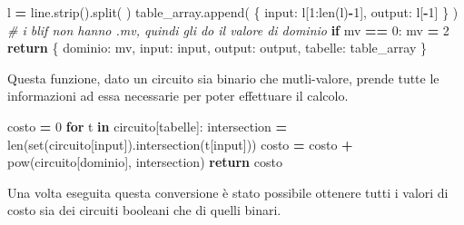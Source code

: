 \documentclass[
  italian,
]{book}
\newenvironment{Shaded}{\begin{snugshade}}{\end{snugshade}}
\newcommand{\BuiltInTok}[1]{#1}
\newcommand{\CommentTok}[1]{\textcolor[rgb]{0.56,0.35,0.01}{\textit{#1}}}
\newcommand{\ControlFlowTok}[1]{\textcolor[rgb]{0.13,0.29,0.53}{\textbf{#1}}}
\newcommand{\DecValTok}[1]{\textcolor[rgb]{0.00,0.00,0.81}{#1}}
\newcommand{\KeywordTok}[1]{\textcolor[rgb]{0.13,0.29,0.53}{\textbf{#1}}}
\newcommand{\NormalTok}[1]{#1}
\newcommand{\OperatorTok}[1]{\textcolor[rgb]{0.81,0.36,0.00}{\textbf{#1}}}
\newcommand{\StringTok}[1]{\textcolor[rgb]{0.31,0.60,0.02}{#1}}
\begin{document}
\begin{Shaded}
\begin{Highlighting}[]
\NormalTok{      l }\OperatorTok{=}\NormalTok{ line.strip().split(}\StringTok{\textquotesingle{} \textquotesingle{}}\NormalTok{)}
\NormalTok{      table\_array.append(}
\NormalTok{        \{}
          \StringTok{\textquotesingle{}input\textquotesingle{}}\NormalTok{:    l[}\DecValTok{1}\NormalTok{:}\BuiltInTok{len}\NormalTok{(l)}\OperatorTok{{-}}\DecValTok{1}\NormalTok{],}
          \StringTok{\textquotesingle{}output\textquotesingle{}}\NormalTok{:   l[}\OperatorTok{{-}}\DecValTok{1}\NormalTok{]}
\NormalTok{        \}}
\NormalTok{      )}
  \CommentTok{\# i blif non hanno .mv, quindi gli do il valore di dominio}
  \ControlFlowTok{if}\NormalTok{ mv }\OperatorTok{==} \DecValTok{0}\NormalTok{:}
\NormalTok{    mv }\OperatorTok{=} \DecValTok{2}
  \ControlFlowTok{return}\NormalTok{ \{}
    \StringTok{\textquotesingle{}dominio\textquotesingle{}}\NormalTok{:   mv,}
    \StringTok{\textquotesingle{}input\textquotesingle{}}\NormalTok{:    }\BuiltInTok{input}\NormalTok{,}
    \StringTok{\textquotesingle{}output\textquotesingle{}}\NormalTok{:   output,}
    \StringTok{\textquotesingle{}tabelle\textquotesingle{}}\NormalTok{:  table\_array}
\NormalTok{  \}}
\end{Highlighting}
\end{Shaded}

\newpage

Questa funzione, dato un circuito sia binario che mutli-valore, prende tutte le informazioni ad essa necessarie per poter effettuare il calcolo.

\begin{Shaded}
\begin{Highlighting}[]
\NormalTok{costo }\OperatorTok{=} \DecValTok{0}
\ControlFlowTok{for}\NormalTok{ t }\KeywordTok{in}\NormalTok{ circuito[}\StringTok{\textquotesingle{}tabelle\textquotesingle{}}\NormalTok{]:}
\NormalTok{  intersection }\OperatorTok{=} \BuiltInTok{len}\NormalTok{(}\BuiltInTok{set}\NormalTok{(circuito[}\StringTok{\textquotesingle{}input\textquotesingle{}}\NormalTok{]).intersection(t[}\StringTok{\textquotesingle{}input\textquotesingle{}}\NormalTok{]))}
\NormalTok{  costo }\OperatorTok{=}\NormalTok{ costo }\OperatorTok{+} \BuiltInTok{pow}\NormalTok{(circuito[}\StringTok{\textquotesingle{}dominio\textquotesingle{}}\NormalTok{], intersection)}
\ControlFlowTok{return}\NormalTok{ costo}
\end{Highlighting}
\end{Shaded}

Una volta eseguita questa conversione è stato possibile ottenere tutti i valori di costo sia dei circuiti booleani che di quelli binari.
\end{document}
